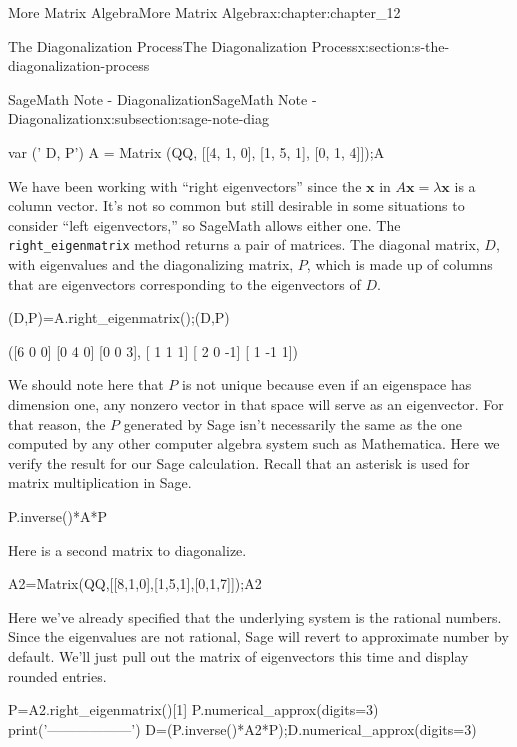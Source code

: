 \documentclass[oneside,10pt,]{book}
\newcommand{\mono}[1]{\texttt{#1}}
\numberwithin{equation}{section}
\renewcommand{\vec}[1]{\mathbf{#1}}
\begin{document}
\begin{chapterptx}{More Matrix Algebra}{}{More Matrix Algebra}{}{}{x:chapter:chapter_12}
\begin{sectionptx}{The Diagonalization Process}{}{The Diagonalization Process}{}{}{x:section:s-the-diagonalization-process}
\begin{subsectionptx}{SageMath Note - Diagonalization}{}{SageMath Note - Diagonalization}{}{}{x:subsection:sage-note-diag}
\begin{sageinput}
var (' D, P')
A = Matrix (QQ, [[4, 1, 0], [1, 5, 1], [0, 1, 4]]);A
\end{sageinput}
\begin{sageoutput}
[4 1 0]
[1 5 1]
[0 1 4]
\end{sageoutput}
We have been working with ``right eigenvectors'' since the \(\vec{x}\) in \(A \vec{x} = \lambda  \vec{x}\) is a column vector. It's not so common but still desirable in some situations to consider ``left eigenvectors,'' so SageMath allows either one. The \mono{right\_eigenmatrix} method returns a pair of matrices.  The diagonal matrix, \(D\), with eigenvalues and the diagonalizing matrix, \(P\), which is made up of columns that are eigenvectors corresponding to the eigenvectors of \(D\).%
\begin{sageinput}
(D,P)=A.right_eigenmatrix();(D,P)
\end{sageinput}
\begin{sageoutput}
([6 0 0]
[0 4 0]
[0 0 3], 
[ 1  1  1]
[ 2  0 -1]
[ 1 -1  1])
\end{sageoutput}
We should note here that \(P\) is not unique because even if an eigenspace has dimension one, any nonzero vector in that space will serve as an eigenvector. For that reason, the \(P\) generated by Sage isn't necessarily the same as the one computed by any other computer algebra system such as Mathematica.  Here we verify the result for our Sage calculation.  Recall that an asterisk is used for matrix multiplication in Sage.%
\begin{sageinput}
P.inverse()*A*P
\end{sageinput}
\begin{sageoutput}
[6 0 0]
[0 4 0]
[0 0 3]
\end{sageoutput}
Here is a second matrix to diagonalize.%
\begin{sageinput}
A2=Matrix(QQ,[[8,1,0],[1,5,1],[0,1,7]]);A2
\end{sageinput}
\begin{sageoutput}
[8 1 0]
[1 5 1]
[0 1 7]
\end{sageoutput}
Here we've already specified that the underlying system is the rational numbers.  Since the eigenvalues are not rational, Sage will revert to approximate number by default. We'll just pull out the matrix of eigenvectors this time and display rounded entries.%
\begin{sageinput}
P=A2.right_eigenmatrix()[1]
P.numerical_approx(digits=3)
print('------------------')
D=(P.inverse()*A2*P);D.numerical_approx(digits=3)
\end{sageinput}

\end{subsectionptx}
\end{sectionptx}
\end{chapterptx}
\end{document}
